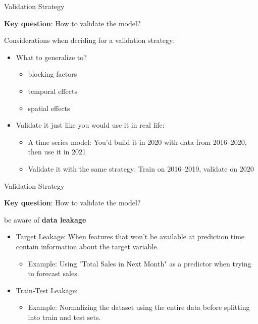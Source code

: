 \documentclass[ignorenonframetext,]{beamer}
\providecommand{\tightlist}{%
  \setlength{\itemsep}{0pt}\setlength{\parskip}{0pt}}
\begin{document}
\begin{frame}{Validation Strategy}
\label{validation-strategy}

\textbf{Key question}: How to validate the model?

Considerations when deciding for a validation strategy:

\begin{itemize}
\tightlist
\item
  What to generalize to?

  \begin{itemize}
  \tightlist
  \item
    blocking factors
  \item
    temporal effects
  \item
    spatial effects
  \end{itemize}
\item
  Validate it just like you would use it in real life:
  \begin{itemize}
  \tightlist
  \item
    A time series model: You'd build it in 2020 with data from
    2016--2020, then use it in 2021
  \item
    Validate it with the same strategy: Train on 2016--2019, validate on
    2020
  \end{itemize}
\end{itemize}

\end{frame}

\begin{frame}{Validation Strategy}
\label{validation-strategy}

\textbf{Key question}: How to validate the model?

be aware of \textbf{data leakage}
\begin{itemize}
\tightlist
    \item Target Leakage: When features that won’t be available at prediction time contain information about the target variable.
    \begin{itemize}
    \tightlist
        \item Example: Using "Total Sales in Next Month" as a predictor when trying to forecast sales.
    \end{itemize} 
    \item Train-Test Leakage: 
    \begin{itemize}
    \tightlist
        \item Example: Normalizing the dataset using the entire data before splitting into train and test sets.
    \end{itemize}
\end{itemize}
\end{frame}
\end{document}
